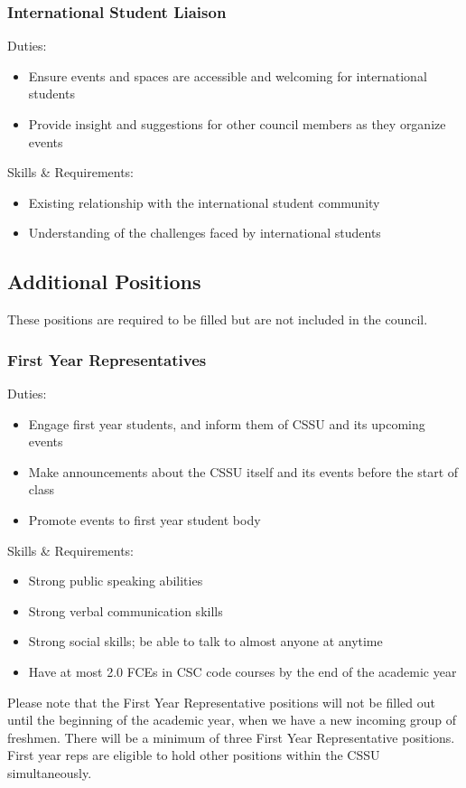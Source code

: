 \documentclass{article}
\begin{document}
\subsubsection{International Student Liaison} \label{sec:2.3.4}
Duties:
\begin{itemize}
    \item Ensure events and spaces are accessible and welcoming for international students
    \item Provide insight and suggestions for other council members as they organize events
\end{itemize}
Skills & Requirements:
\begin{itemize}
    \item Existing relationship with the international student community
    \item Understanding of the challenges faced by international students
\end{itemize}

\subsection{Additional Positions} \label{sec:2.4}
These positions are required to be filled but are not included in the council.
\subsubsection{First Year Representatives} \label{sec:2.4.1}
Duties:
\begin{itemize}
    \item Engage first year students, and inform them of CSSU and its upcoming events
    \item Make announcements about the CSSU itself and its events before the start of class
    \item Promote events to first year student body
\end{itemize}
Skills & Requirements:
\begin{itemize}
    \item Strong public speaking abilities
    \item Strong verbal communication skills
    \item Strong social skills; be able to talk to almost anyone at anytime
    \item Have at most 2.0 FCEs in CSC code courses by the end of the academic year
\end{itemize}
Please note that the First Year Representative positions will not be filled out until the beginning of the academic year, when we have a new incoming group of freshmen. There will be a minimum of three First Year Representative positions. First year reps are eligible to hold other positions within the CSSU simultaneously.
\end{document}
